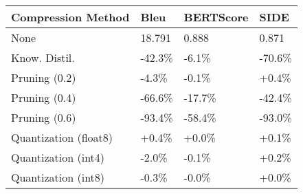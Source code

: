 \begin{tabular}{llll}
\toprule
\textbf{Compression Method} & \textbf{Bleu} & \textbf{BERTScore} & \textbf{SIDE} \\
\midrule
None & 18.791 & 0.888 & 0.871 \\
Know. Distil. & -42.3\% & -6.1\% & -70.6\% \\
Pruning (0.2) & -4.3\% & -0.1\% & +0.4\% \\
Pruning (0.4) & -66.6\% & -17.7\% & -42.4\% \\
Pruning (0.6) & -93.4\% & -58.4\% & -93.0\% \\
Quantization (float8) & +0.4\% & +0.0\% & +0.1\% \\
Quantization (int4) & -2.0\% & -0.1\% & +0.2\% \\
Quantization (int8) & -0.3\% & -0.0\% & +0.0\% \\
\bottomrule
\end{tabular}
